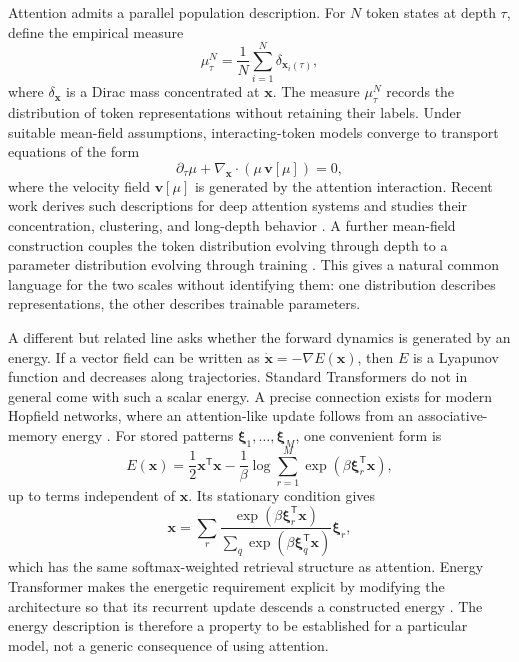 \documentclass[11pt]{article}
\begin{document}
Attention admits a parallel population description. For $N$ token states at depth $\tau$, define the empirical measure
\begin{equation}
\mu_\tau^N
=
\frac{1}{N}
\sum_{i=1}^{N}
\delta_{\mathbf x_i(\tau)},
\label{eq:token-measure}
\end{equation}
where $\delta_{\mathbf x}$ is a Dirac mass concentrated at $\mathbf x$. The measure $\mu_\tau^N$ records the distribution of token representations without retaining their labels. Under suitable mean-field assumptions, interacting-token models converge to transport equations of the form
\begin{equation}
\partial_\tau\mu
+
\nabla_{\mathbf x}\cdot
\left(
\mu\,\mathbf v[\mu]
\right)
=
0,
\label{eq:token-pde}
\end{equation}
where the velocity field $\mathbf v[\mu]$ is generated by the attention interaction. Recent work derives such descriptions for deep attention systems and studies their concentration, clustering, and long-depth behavior \cite{castin2025,rigollet2025}. A further mean-field construction couples the token distribution evolving through depth to a parameter distribution evolving through training \cite{herty2026}. This gives a natural common language for the two scales without identifying them: one distribution describes representations, the other describes trainable parameters.

A different but related line asks whether the forward dynamics is generated by an energy. If a vector field can be written as $\dot{\mathbf x}=-\nabla E(\mathbf x)$, then $E$ is a Lyapunov function and decreases along trajectories. Standard Transformers do not in general come with such a scalar energy. A precise connection exists for modern Hopfield networks, where an attention-like update follows from an associative-memory energy \cite{ramsauer2021}. For stored patterns $\boldsymbol\xi_1,\ldots,\boldsymbol\xi_M$, one convenient form is
\begin{equation}
E(\mathbf x)
=
\frac{1}{2}\mathbf x^{\mathsf T}\mathbf x
-
\frac{1}{\beta}
\log
\sum_{r=1}^{M}
\exp\left(
\beta\boldsymbol\xi_r^{\mathsf T}\mathbf x
\right),
\label{eq:hopfield-energy}
\end{equation}
up to terms independent of $\mathbf x$. Its stationary condition gives
\begin{equation}
\mathbf x
=
\sum_r
\frac{
\exp(\beta\boldsymbol\xi_r^{\mathsf T}\mathbf x)
}{
\sum_q\exp(\beta\boldsymbol\xi_q^{\mathsf T}\mathbf x)
}
\boldsymbol\xi_r,
\end{equation}
which has the same softmax-weighted retrieval structure as attention. Energy Transformer makes the energetic requirement explicit by modifying the architecture so that its recurrent update descends a constructed energy \cite{hoover2023}. The energy description is therefore a property to be established for a particular model, not a generic consequence of using attention.
\end{document}
